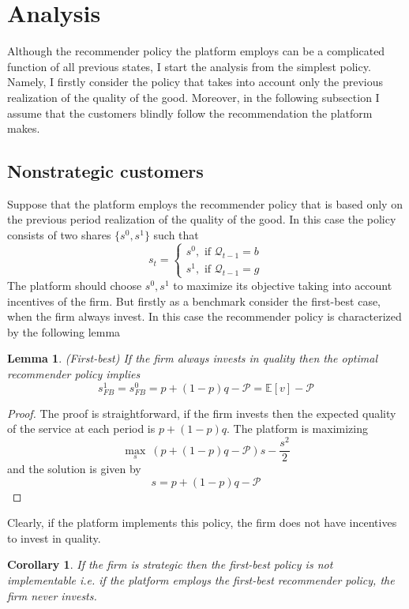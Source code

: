 \documentclass[a4paper]{article}
\newcommand{\expect}{\mathbb{E}}
\newtheorem{corollary}{Corollary}[theorem]
\newtheorem{lemma}[theorem]{Lemma}
\begin{document}
\section{Analysis}
Although the recommender policy the platform employs can be a complicated function of all previous states, I start the analysis from the simplest policy. Namely, I firstly consider the policy that takes into account only the previous realization of the quality of the good. Moreover, in the following subsection I assume that the customers blindly follow the recommendation the platform makes.
\subsection{Nonstrategic customers}
Suppose that the platform employs the recommender policy that is based only on the previous period realization of the quality of the good. In this case the policy consists of two shares $\{s^0, s^1\}$ such that $$s_t = \begin{cases}
s^0, \text{ if }\mathcal{Q}_{t-1} = b\\
s^1, \text{ if }\mathcal{Q}_{t-1} = g
\end{cases}$$
The platform should choose $s^0, s^1$ to maximize its objective taking into account incentives of the firm. But firstly as a benchmark consider the first-best case, when the firm always invest. In this case the recommender policy is characterized by the following lemma

\begin{lemma}(First-best)
	If the firm always invests in quality then the optimal recommender policy implies $$s^1_{FB} = s^0_{FB} = p + (1-p)q - \mathcal{P} = \expect[v] - \mathcal{P}$$
\end{lemma}
\begin{proof}
	The proof is straightforward, if the firm invests then the expected quality of the service at each period is $p+(1-p)q$. The platform is maximizing $$\underset{s}{\max}\ (p+(1-p)q - \mathcal{P})s - \frac{s^2}{2}$$ and the solution is given by $$s = p + (1-p)q - \mathcal{P}$$
\end{proof}
Clearly, if the platform implements this policy, the firm does not have incentives to invest in quality. 
\begin{corollary}
	If the firm is strategic then the first-best policy is not implementable i.e. if the platform employs the first-best recommender policy, the firm never invests.
\end{corollary}
\end{document}
